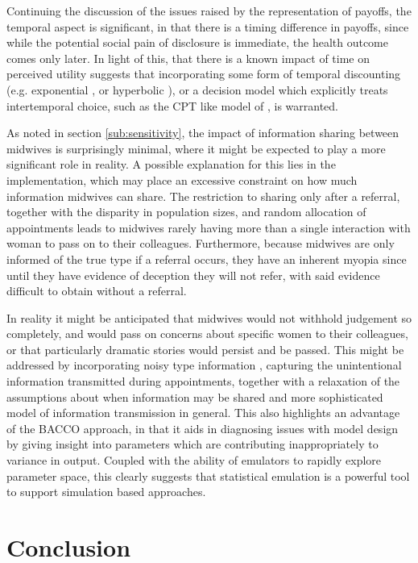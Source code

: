 Continuing the discussion of the issues raised by the representation of payoffs, the temporal aspect is significant, in that there is a timing difference in payoffs, since while the potential social pain of disclosure is immediate, the health outcome comes only later. In light of this, that there is a known impact of time on perceived utility \citet{Thaler1981} suggests that incorporating some form of temporal discounting (e.g. exponential \citep{Samuelson1937}, or hyperbolic \citep{Ainslie1991}), or a decision model which explicitly treats intertemporal choice, such as the \ac{CPT} like model of \citet{Loewenstein1992}, is warranted. 

As noted in section \ref{sub:sensitivity}, the impact of information sharing between midwives is surprisingly minimal, where it might be expected to play a more significant role in reality. A possible explanation for this lies in the implementation, which may place an excessive constraint on how much information midwives can share. The restriction to sharing only after a referral, together with the disparity in population sizes, and random allocation of appointments leads to midwives rarely having more than a single interaction with woman to pass on to their colleagues. Furthermore, because midwives are only informed of the true type if a referral occurs, they have an inherent myopia since until they have evidence of deception they will not refer, with said evidence difficult to obtain without a referral.

In reality it might be anticipated that midwives would not withhold judgement so completely, and would pass on concerns about specific women to their colleagues, or that particularly dramatic stories would persist and be passed. This might be addressed by incorporating noisy type information \citep{Feltovich2002}, capturing the unintentional information transmitted during appointments, together with a relaxation of the assumptions about when information may be shared and more sophisticated model of information transmission in general. This also highlights an advantage of the \ac{BACCO} approach, in that it aids in diagnosing issues with model design by giving insight into parameters which are contributing inappropriately to variance in output. Coupled with the ability of emulators to rapidly explore parameter space, this clearly suggests that statistical emulation is a powerful tool to support simulation based approaches.

\section{Conclusion}
\label{sec:conclusion}

